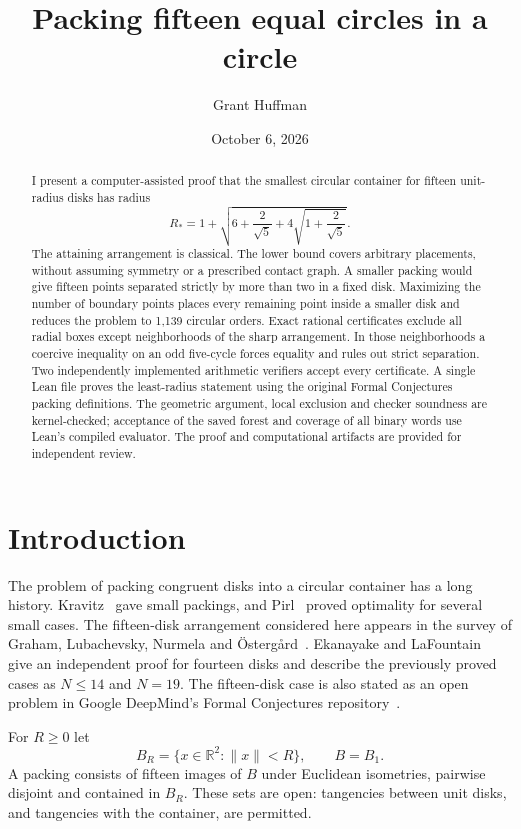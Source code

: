 \documentclass[11pt]{amsart}
\title[Fifteen equal circles in a circle]{Packing fifteen equal circles in a circle}
\author{Grant Huffman}
\date{October 6, 2026}
\theoremstyle{definition}
\theoremstyle{remark}
\numberwithin{equation}{section}
\newcommand{\R}{\mathbb R}
\newcommand{\norm}[1]{\lVert #1\rVert}
\newcommand{\Ropt}{R_*}
\begin{document}
\begin{abstract}
I present a computer-assisted proof that the smallest circular container for
fifteen unit-radius disks has radius
\[
 \Ropt=1+\sqrt{6+\frac{2}{\sqrt5}+4\sqrt{1+\frac{2}{\sqrt5}}}.
\]
The attaining arrangement is classical. The lower bound covers arbitrary
placements, without assuming symmetry or a prescribed contact graph.
A smaller packing would give fifteen points separated strictly by more than
two in a fixed disk. Maximizing the number of boundary points places every
remaining point inside a smaller disk and reduces the problem to 1,139
circular orders. Exact rational certificates exclude all radial boxes except
neighborhoods of the sharp arrangement. In those neighborhoods a coercive
inequality on an odd five-cycle forces equality and rules out strict
separation. Two independently implemented arithmetic verifiers accept every
certificate. A single Lean file proves the least-radius statement using the
original Formal Conjectures packing definitions. The geometric argument,
local exclusion and checker soundness are kernel-checked; acceptance of the
saved forest and coverage of all binary words use Lean's compiled evaluator.
The proof and computational artifacts are provided for independent review.
\end{abstract}
\maketitle

\section{Introduction}

The problem of packing congruent disks into a circular container has a long
history. Kravitz~\cite{kravitz} gave small packings, and Pirl~\cite{pirl}
proved optimality for several small cases. The fifteen-disk arrangement
considered here appears in the survey of Graham, Lubachevsky, Nurmela and
\"Osterg\aa rd~\cite{graham}. Ekanayake and LaFountain~\cite{ekanayake}
give an independent proof for fourteen disks and describe the previously
proved cases as $N\leq14$ and $N=19$. The fifteen-disk case is also stated as
an open problem in Google DeepMind's Formal Conjectures
repository~\cite{formalconjectures}.

For $R\geq0$ let
\[
 B_R=\{x\in\R^2:\norm{x}<R\},\qquad B=B_1.
\]
A packing consists of fifteen images of $B$ under Euclidean isometries,
pairwise disjoint and contained in $B_R$. These sets are open: tangencies
between unit disks, and tangencies with the container, are permitted.
\end{document}

